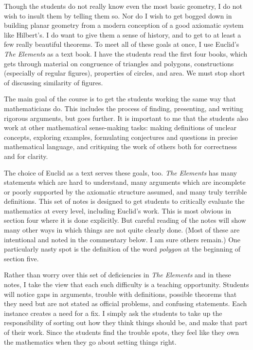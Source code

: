 \begin{annotation}
Though the students do not really know even the most basic geometry, I do not wish to insult them by telling them so. Nor do I wish to get bogged down in building planar geometry from a modern conception of a good axiomatic system like Hilbert's\cite{Hilbert}. I do want to give them a sense of history, and to get to at least a few really beautiful theorems. To meet all of these goals at once, I use Euclid's \emph{The Elements}\cite{Euclid} as a text book. I have the students read the first four books, which gets through material on congruence of triangles and polygons, constructions (especially of regular figures), properties of circles, and area. We must stop short of discussing similarity of figures.

The main goal of the course is to get the students working the same way that mathematicians do. This includes the process of finding, presenting, and writing rigorous arguments, but goes further. It is important to me that the students also work at other mathematical sense-making tasks: making definitions of unclear concepts, exploring examples, formulating conjectures and questions in precise mathematical language, and critiquing the work of others both for correctness and for clarity. 

The choice of Euclid as a text serves these goals, too. \emph{The Elements} has many statements which are hard to understand, many arguments which are incomplete or poorly supported by the axiomatic structure assumed, and many truly terrible definitions. This set of notes is designed to get students to critically evaluate the mathematics at every level, including Euclid's work. This is most obvious in section four where it is done explicitly. But careful reading of the notes will show many other ways in which things are not quite clearly done. (Most of these are intentional and noted in the commentary below. I am sure others remain.) One particularly nasty spot is the definition of the word \emph{polygon} at the beginning of section five. 

Rather than worry over this set of deficiencies in \emph{The Elements} and in these notes, I take the view that each such difficulty is a teaching opportunity. Students will notice gaps in arguments, trouble with definitions, possible theorems that they need but are not stated as official problems, and confusing statements. Each instance creates a need for a fix. I simply ask the students to take up the responsibility of sorting out how they think things should be, and make that part of their work. Since the students find the trouble spots, they feel like they own the mathematics when they go about setting things right.


\end{annotation}
